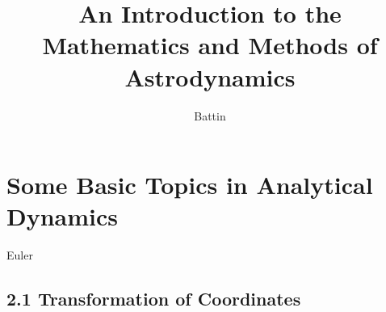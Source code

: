 \documentclass[12pt]{book}
\begin{document}
\title{An Introduction to the Mathematics and Methods of Astrodynamics}
\author{Battin}
\maketitle


\chapter{Some Basic Topics in Analytical Dynamics}
Euler

\section{2.1 Transformation of Coordinates}
\end{document}

